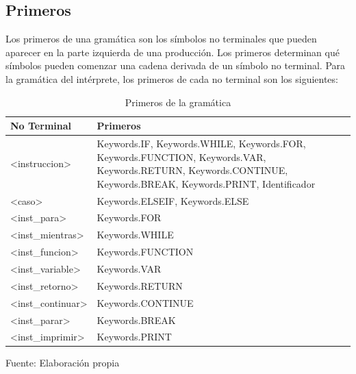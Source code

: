 \subsection{Primeros}
Los primeros de una gramática son los símbolos no terminales que pueden aparecer en la parte izquierda de una producción. Los primeros determinan qué símbolos pueden comenzar una cadena derivada de un símbolo no terminal. Para la gramática del intérprete, los primeros de cada no terminal son los siguientes:
\begin{table}[!h]
  \begin{center}
    \begin{tabularx}{1\textwidth}{|X|X|}
      \hline
      \textbf{No Terminal} & \textbf{Primeros} \\
      \hline
      <instruccion> & Keywords.IF, Keywords.WHILE, Keywords.FOR, Keywords.FUNCTION, Keywords.VAR, Keywords.RETURN, Keywords.CONTINUE, Keywords.BREAK, Keywords.PRINT, Identificador \\
      \hline
      <caso> & Keywords.ELSEIF, Keywords.ELSE \\
      \hline
      <inst\_para> & Keywords.FOR \\
      \hline
      <inst\_mientras> & Keywords.WHILE \\
      \hline
      <inst\_funcion> & Keywords.FUNCTION \\
      \hline
      <inst\_variable> & Keywords.VAR \\
      \hline
      <inst\_retorno> & Keywords.RETURN \\
      \hline
      <inst\_continuar> & Keywords.CONTINUE \\
      \hline
      <inst\_parar> & Keywords.BREAK \\
      \hline
      <inst\_imprimir> & Keywords.PRINT \\
      \hline
    \end{tabularx}
  \end{center}
  \caption{Primeros de la gramática}
  \centering Fuente: Elaboración propia
  \label{tab:primeros}
\end{table}
\newpage

